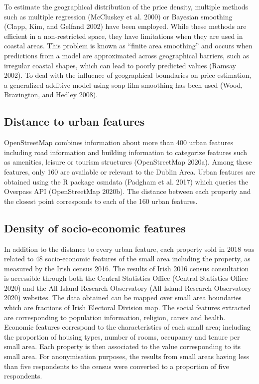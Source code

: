 \documentclass[conference,final,]{IEEEtran}
\begin{document}
To estimate the geographical distribution of the price density, multiple methods such as multiple regression (McCluskey et al. 2000) or Bayesian smoothing (Clapp, Kim, and Gelfand 2002) have been employed. While these methods are efficient in a non-restricted space, they have limitations when they are used in coastal areas. This problem is known as ``finite area smoothing'' and occurs when predictions from a model are approximated across geographical barriers, such as irregular coastal shapes, which can lead to poorly predicted values (Ramsay 2002). To deal with the influence of geographical boundaries on price estimation, a generalized additive model using soap film smoothing has been used (Wood, Bravington, and Hedley 2008).

\hypertarget{distance-to-urban-features}{%
\subsection{Distance to urban features}\label{distance-to-urban-features}}

OpenStreetMap combines information about more than 400 urban features including road information and building information to categorize features such as amenities, leisure or tourism structures (OpenStreetMap 2020a). Among these features, only 160 are available or relevant to the Dublin Area. Urban features are obtained using the R package osmdata (Padgham et al. 2017) which queries the Overpass API (OpenStreetMap 2020b). The distance between each property and the closest point corresponds to each of the 160 urban features.

\hypertarget{density-of-socio-economic-features}{%
\subsection{Density of socio-economic features}\label{density-of-socio-economic-features}}

In addition to the distance to every urban feature, each property sold in 2018 was related to 48 socio-economic features of the small area including the property, as measured by the Irish census 2016. The results of Irish 2016 census consultation is accessible through both the Central Statistics Office (Central Statistics Office 2020) and the All-Island Research Observatory (All-Island Research Observatory 2020) websites. The data obtained can be mapped over small area boundaries which are fractions of Irish Electoral Division map. The social features extracted are corresponding to population information, religion, carers and health. Economic features correspond to the characteristics of each small area; including the proportion of housing types, number of rooms, occupancy and tenure per small area. Each property is then associated to the value corresponding to its small area. For anonymisation purposes, the results from small areas having less than five respondents to the census were converted to a proportion of five respondents.
\end{document}
